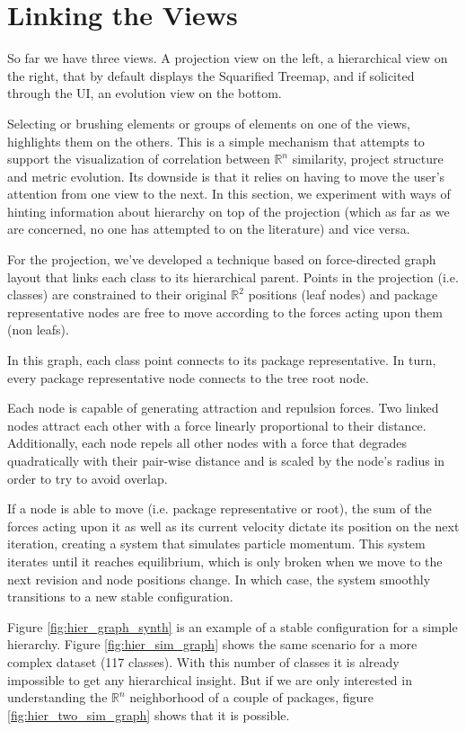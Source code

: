 \section{Linking the Views} \label{sec:linking}
So far we have three views. A projection view on the left, a hierarchical view on the right, that by default displays the Squarified Treemap, and if solicited through the UI, an evolution view on the bottom.

Selecting or brushing elements or groups of elements on one of the views, highlights them on the others. This is a simple mechanism that attempts to support the visualization of correlation between $\mathbb{R}^{n}$ similarity, project structure and metric evolution. Its downside is that it relies on having to move the user's attention from one view to the next. In this section, we experiment with ways of hinting information about hierarchy on top of the projection (which as far as we are concerned, no one has attempted to on the literature) and vice versa.

For the projection, we've developed a technique based on force-directed graph layout that links each class to its hierarchical parent. Points in the projection (i.e. classes) are constrained to their original $\mathbb{R}^{2}$ positions (leaf nodes) and package representative nodes are free to move according to the forces acting upon them (non leafs).

In this graph, each class point connects to its package representative. In turn, every package representative node connects to the tree root node.

Each node is capable of generating attraction and repulsion forces. Two linked nodes attract each other with a force linearly proportional to their distance. Additionally, each node repels all other nodes with a force that degrades quadratically with their pair-wise distance and is scaled by the node's radius in order to try to avoid overlap.

If a node is able to move (i.e. package representative or root), the sum of the forces acting upon it as well as its current velocity dictate its position on the next iteration, creating a system that simulates particle momentum. This system iterates until it reaches equilibrium, which is only broken when we move to the next revision and node positions change. In which case, the system smoothly transitions to a new stable configuration.

Figure \ref{fig:hier_graph_synth} is an example of a stable configuration for a simple hierarchy. Figure \ref{fig:hier_sim_graph} shows the same scenario for a more complex dataset (117 classes). With this number of classes it is already impossible to get any hierarchical insight. But if we are only interested in understanding the $\mathbb{R}^{n}$ neighborhood of a couple of packages, figure \ref{fig:hier_two_sim_graph} shows that it is possible.

